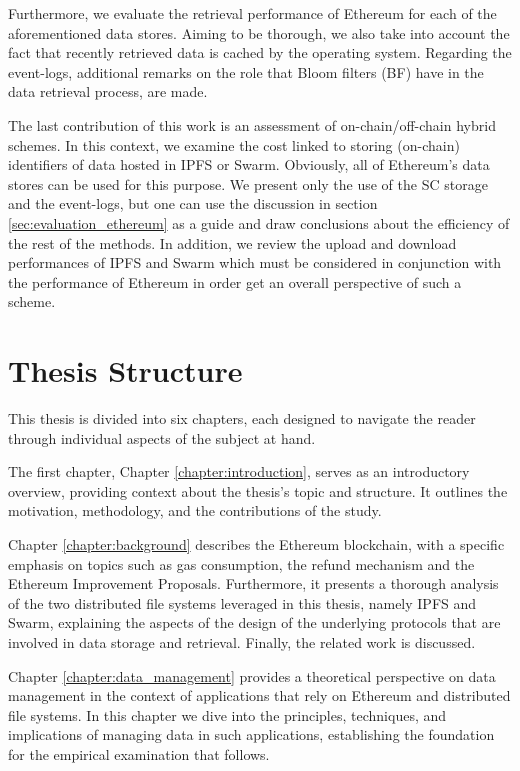 Furthermore, we evaluate the retrieval performance of Ethereum for each of the aforementioned data stores. Aiming to be thorough, we also take into account the fact that recently retrieved data is cached by the operating system. Regarding the event-logs, additional remarks on the role that Bloom filters (BF) have in the data retrieval process, are made.

The last contribution of this work is an assessment of on-chain/off-chain hybrid schemes. In this context, we examine the cost linked to storing (on-chain) identifiers of data hosted in IPFS or Swarm. Obviously, all of Ethereum's data stores can be used for this purpose. We present only the use of the SC storage and the event-logs, but one can use the discussion in section \ref{sec:evaluation_ethereum} as a guide and draw conclusions about the efficiency of the rest of the methods. In addition, we review the upload and download performances of IPFS and Swarm which must be considered in conjunction with the performance of Ethereum in order get an overall perspective of such a scheme. 

\section{Thesis Structure}\label{sec:organization}

This thesis is divided into six chapters, each designed to navigate the reader through individual aspects of the subject at hand.

The first chapter, Chapter \ref{chapter:introduction}, serves as an introductory overview, providing context about the thesis's topic and structure. It outlines the motivation, methodology, and the contributions of the study.

Chapter \ref{chapter:background} describes the Ethereum blockchain, with a specific emphasis on topics such as gas consumption, the refund mechanism and the Ethereum Improvement Proposals. Furthermore, it presents a thorough analysis of the two distributed file systems leveraged in this thesis, namely IPFS and Swarm, explaining the aspects of the design of the underlying protocols that are involved in data storage and retrieval. Finally, the related work is discussed.

Chapter \ref{chapter:data_management} provides a theoretical perspective on data management in the context of applications that rely on Ethereum and distributed file systems. In this chapter we dive into the principles, techniques, and implications of managing data in such applications, establishing the foundation for the empirical examination that follows.

